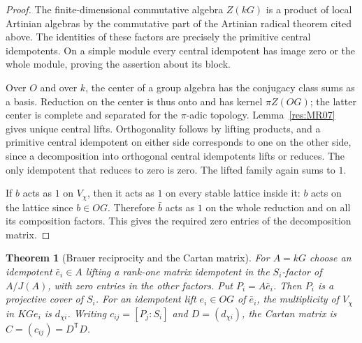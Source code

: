 \documentclass[11pt,oneside,openany]{book}
\newtheorem{theorem}{Theorem}[chapter]
\theoremstyle{definition}
\theoremstyle{remark}
\begin{document}
\begin{proof}
The finite-dimensional commutative algebra \(Z(kG)\) is a
product of local Artinian algebras by the commutative part of
the Artinian radical theorem cited above. The identities of
these factors are precisely the primitive central idempotents.
On a simple module every central idempotent has image zero or
the whole module, proving the assertion about its block.

Over \(O\) and over \(k\), the center of a group algebra has
the conjugacy class sums as a basis. Reduction on the center
is thus onto and has kernel \(\pi Z(OG)\); the latter center
is complete and separated for the \(\pi\)-adic topology.
Lemma~\ref{res:MR07} gives unique central lifts. Orthogonality
follows by lifting products, and a primitive central
idempotent on either side corresponds to one on the other
side, since a decomposition into orthogonal central
idempotents lifts or reduces. The only idempotent that
reduces to zero is zero. The lifted family again sums to \(1\).

If \(b\) acts as \(1\) on \(V_\chi\), then it acts as \(1\)
on every stable lattice inside it: \(b\) acts on the lattice
since \(b\in OG\). Therefore \(\bar b\) acts as \(1\) on the
whole reduction and on all its composition factors. This
gives the required zero entries of the decomposition matrix.
\end{proof}

\begin{theorem}[Brauer reciprocity and the Cartan matrix]
\label{res:MR09}
For \(A=kG\) choose an idempotent \(\bar e_i\in A\) lifting a
rank-one matrix idempotent in the \(S_i\)-factor of \(A/J(A)\),
with zero entries in the other factors. Put \(P_i=A\bar e_i\).
Then \(P_i\) is a projective cover of \(S_i\). For an
idempotent lift \(e_i\in OG\) of \(\bar e_i\), the
multiplicity of \(V_\chi\) in \(KGe_i\) is \(d_{\chi i}\).
Writing \(c_{ij}=[P_j:S_i]\) and \(D=(d_{\chi i})\), the
Cartan matrix is \(C=(c_{ij})=D^{\mathsf T}D\).
\end{theorem}
\end{document}
